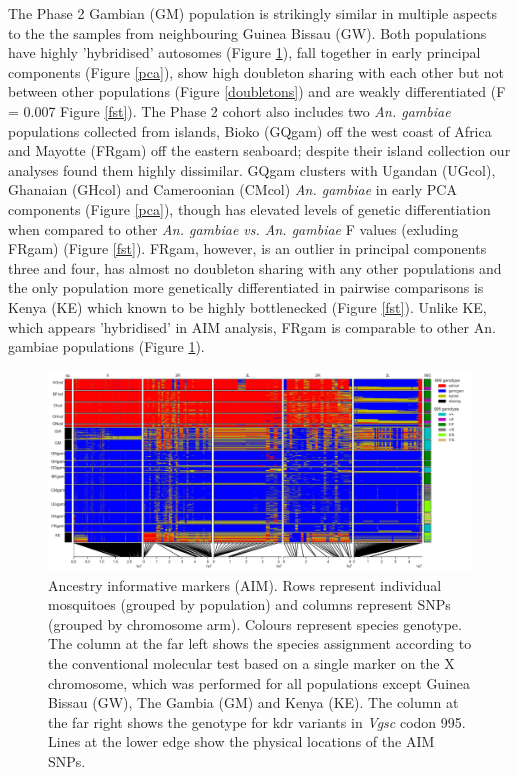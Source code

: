 \documentclass[a4paper,11pt,abstracton,hidelinks]{scrartcl}
\begin{document}
%
The Phase 2 Gambian (GM) population is strikingly similar in multiple aspects to the the samples from neighbouring Guinea Bissau (GW).
%
Both populations have highly 'hybridised' autosomes (Figure \ref{aim}), fall together in early principal components (Figure \ref{pca}), show high doubleton sharing with each other but not between other populations (Figure \ref{doubletons}) and are weakly differentiated (F = 0.007 Figure \ref{fst}).
%
The Phase 2 cohort also includes two \textit{An. gambiae} populations collected from islands, Bioko (GQgam) off the west coast of Africa and Mayotte (FRgam) off the eastern seaboard; despite their island collection our analyses found them highly dissimilar. 
%
GQgam clusters with Ugandan (UGcol), Ghanaian (GHcol) and Cameroonian (CMcol) \textit{An. gambiae} in early PCA components (Figure \ref{pca}), though has elevated levels of genetic differentiation when compared to other 
\textit{An. gambiae vs. An. gambiae} F values (exluding FRgam) (Figure \ref{fst}). 
%
FRgam, however, is an outlier in principal components three and four, has almost no doubleton sharing with any other populations and the only population more genetically differentiated in pairwise comparisons is Kenya (KE) which known to be highly bottlenecked \cite{Ag1000gConsortium2017} (Figure \ref{fst}).
% 
Unlike KE, which appears 'hybridised' in AIM analysis, FRgam is comparable to other An. gambiae populations (Figure \ref{aim}).


\begin{figure}[H]
	\begin{center}
		\includegraphics*[width=6.3in]{artwork/AIM_figure_scaled.jpg}
	\end{center}
	\caption{Ancestry informative markers (AIM). Rows represent individual mosquitoes (grouped by population) and columns represent SNPs (grouped by chromosome arm). Colours represent species genotype. The column at the far left shows the species assignment according to the conventional molecular test based on a single marker on the X chromosome, which was performed for all populations except Guinea Bissau (GW), The Gambia (GM) and Kenya (KE). The column at the far right shows the genotype for kdr variants in \textit{Vgsc} codon 995. Lines at the lower edge show the physical locations of the AIM SNPs.}
	\label{aim}
\end{figure}
\end{document}
